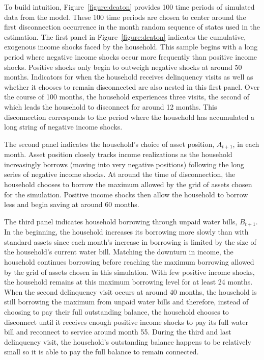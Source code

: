 \documentclass[12pt]{article}
\begin{document}
To build intuition, Figure~\ref{figure:deaton} provides 100 time periods of simulated data from the model.  These 100 time periods are chosen to center around the first disconnection occurrence in the month random sequence of states used in the estimation.  The first panel in Figure~\ref{figure:deaton} indicates the cumulative, exogenous income shocks faced by the household.  This sample begins with a long period where negative income shocks occur more frequently than positive income shocks.  Positive shocks only begin to outweigh negative shocks at around 50 months.  Indicators for when the household receives delinquency visits as well as whether it chooses to remain disconnected are also nested in this first panel.  Over the course of 100 months, the household experiences three visits, the second of which leads the household to disconnect for around 12 months.  This disconnection corresponds to the period where the household has accumulated a long string of negative income shocks.

The second panel indicates the household's choice of asset position, $A_{t+1}$, in each month.  Asset position closely tracks income realizations as the household increasingly borrows (moving into very negative positions) following the long series of negative income shocks.  At around the time of disconnection, the household chooses to borrow the maximum allowed by the grid of assets chosen for the simulation.  Positive income shocks then allow the household to borrow less and begin saving at around 60 months.

The third panel indicates household borrowing through unpaid water bills, $B_{t+1}$.  In the beginning, the household increases its borrowing more slowly than with standard assets since each month's increase in borrowing is limited by the size of the household's current water bill.  Matching the downturn in income, the household continues borrowing before reaching the maximum borrowing allowed by the grid of assets chosen in this simulation.  With few positive income shocks, the household remains at this maximum borrowing level for at least 24 months.  When the second delinquency visit occurs at around 40 months, the household is still borrowing the maximum from unpaid water bills and therefore, instead of choosing to pay their full outstanding balance, the household chooses to disconnect until it receives enough positive income shocks to pay its full water bill and reconnect to service around month 55.  During the third and last delinquency visit, the household's outstanding balance happens to be relatively small so it is able to pay the full balance to remain connected.
\end{document}
